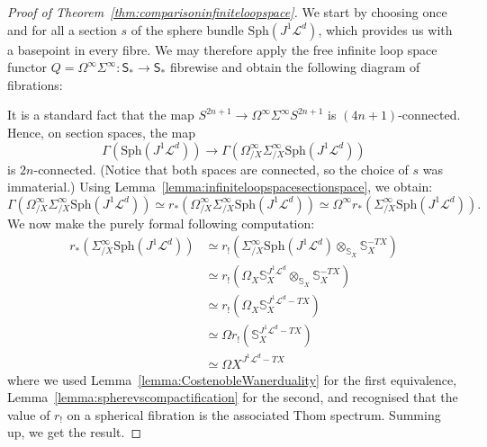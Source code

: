 \documentclass[a4paper]{amsart}
\newcommand{\bS}{\mathbb S}
\newcommand{\cL}{\mathcal L}
\newcommand{\Sph}{\mathrm{Sph}}
\theoremstyle{plain}
\theoremstyle{definition}
\newcommand{\catS}{\mathsf{S}}
\begin{document}
\begin{proof}[Proof of Theorem~\ref{thm:comparisoninfiniteloopspace}]
We start by choosing once and for all a section $s$ of the sphere bundle $\mathrm{Sph}(J^1\cL^d)$, which provides us with a basepoint in every fibre. We may therefore apply the free infinite loop space functor $Q = \Omega^\infty \Sigma^\infty \colon \catS_* \to \catS_*$ fibrewise and obtain the following diagram of fibrations:
\begin{center}
\end{center}
It is a standard fact that the map $S^{2n+1} \to \Omega^\infty \Sigma^\infty S^{2n+1}$ is $(4n+1)$-connected. Hence, on section spaces, the map
\[
    \Gamma(\Sph(J^1\cL^d)) \to \Gamma(\Omega^\infty_{/X} \Sigma^\infty_{/X} \Sph(J^1\cL^d))
\]
is $2n$-connected. (Notice that both spaces are connected, so the choice of $s$ was immaterial.) Using Lemma~\ref{lemma:infiniteloopspacesectionspace}, we obtain:
\[
    \Gamma(\Omega^\infty_{/X} \Sigma^\infty_{/X} \Sph(J^1\cL^d)) \simeq r_*(\Omega^\infty_{/X} \Sigma^\infty_{/X} \Sph(J^1\cL^d)) \simeq \Omega^\infty r_*(\Sigma^\infty_{/X} \Sph(J^1\cL^d)).
\]
We now make the purely formal following computation:
\begin{equation*}
\begin{split}
    r_*(\Sigma^\infty_{/X} \Sph(J^1\cL^d)) &\simeq r_!(\Sigma^\infty_{/X} \Sph(J^1\cL^d) \otimes_{\bS_X} \bS_X^{-TX}) \\
        &\simeq r_!(\Omega_X \bS_X^{J^1\cL^d} \otimes_{\bS_X} \bS_X^{-TX}) \\
        &\simeq r_!(\Omega_X \bS_X^{J^1\cL^d - TX}) \\
        &\simeq \Omega r_!(\bS_X^{J^1\cL^d - TX}) \\
        &\simeq \Omega X^{J^1\cL^d - TX}
\end{split}
\end{equation*}
where we used Lemma~\ref{lemma:CostenobleWanerduality} for the first equivalence, Lemma~\ref{lemma:spherevscompactification} for the second, and recognised that the value of $r_!$ on a spherical fibration is the associated Thom spectrum. Summing up, we get the result.

\end{proof}
\end{document}
